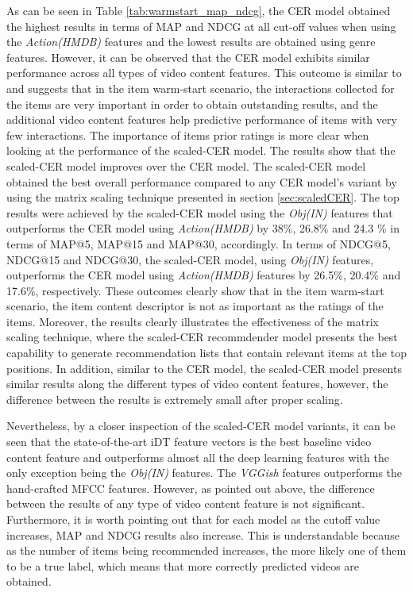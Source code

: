 \documentclass[review]{elsarticle}
\begin{document}
As can be seen in Table \ref{tab:warmstart_map_ndcg}, the CER model obtained the highest results in terms of MAP and NDCG at all cut-off values when using the \textit{Action(HMDB)} features and the lowest results are obtained using genre features. However, it can be observed that the CER model exhibits similar performance across all types of video content features. This outcome is similar to \citep{du2018personalized} and suggests that in the item warm-start scenario, the interactions collected for the items are very important in order to obtain outstanding results, and the additional video content features help predictive performance of items with very few interactions. The importance of items prior ratings is more clear when looking at the performance of the scaled-CER model. The results show that the scaled-CER model improves over the CER model. The scaled-CER model obtained the best overall performance compared to any CER model's variant by using the matrix scaling technique presented in section \ref{sec:scaledCER}. The top results were achieved by the scaled-CER model using the \textit{Obj(IN)} features that outperforms the CER model using \textit{Action(HMDB)} by 38\%, 26.8\% and 24.3 \% in terms of MAP@5, MAP@15 and MAP@30, accordingly. In terms of NDCG@5, NDCG@15 and NDCG@30, the scaled-CER model, using \textit{Obj(IN)} features, outperforms the CER model using \textit{Action(HMDB)} features by 26.5\%, 20.4\% and 17.6\%, respectively. These outcomes clearly show that in the item warm-start scenario, the item content descriptor is not as important as the ratings of the items. Moreover, the results clearly illustrates the effectiveness of the matrix scaling technique, where the scaled-CER recommdender model presents the best capability to generate recommendation lists that contain relevant items at the top positions. In addition, similar to the CER model, the scaled-CER model presents similar results along the different types of video content features, however, the difference between the results is extremely small after proper scaling. 

Nevertheless, by a closer inspection of the scaled-CER model variants, it can be seen that the state-of-the-art iDT feature vectors is the best baseline video content feature and outperforms almost all the deep learning features with the only exception being the \textit{Obj(IN)} features. The \textit{VGGish} features outperforms the hand-crafted MFCC features. However, as pointed out above, the difference between the results of any type of video content feature is not significant. Furthermore, it is worth pointing out that for each model as the cutoff value increases, MAP and NDCG results also increase. This is understandable because as the number of items being recommended increases, the more likely one of them to be a true label, which means that more correctly predicted videos are obtained.   
\end{document}
